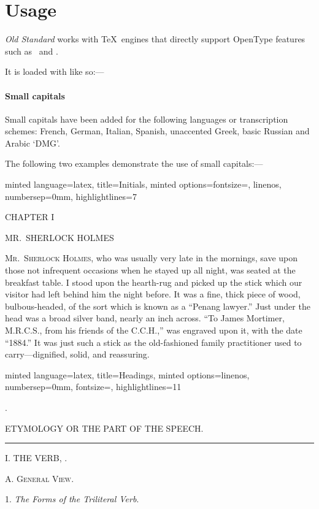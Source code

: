 \section{Usage}
\label{sec:usage}
\emph{Old Standard} works with \TeX\ engines that directly support
OpenType features such as \XeTeX\ and \LuaTeX.

It is loaded with  like so:---
\begin{code}
  \usepackage{fontspec}
  \setmainfont{Old Standard}
\end{code}

\paragraph{Small capitals}
Small capitals have been added for the following languages or
transcription schemes: French, German, Italian, Spanish, unaccented
Greek, basic Russian and Arabic \enquote*{DMG}.

The following two examples demonstrate the use of small capitals:---
\begin{tcblisting}{minted language=latex, title=Initials, minted
    options={fontsize=\smaller, linenos, numbersep=0mm,
      highlightlines={7}}}
  \begin{center}
    CHAPTER I

    MR.\ SHERLOCK HOLMES
  \end{center}
  
  \lettrine[loversize=0.2]{M}{r.\ Sherlock Holmes}, who was usually
  very late in the mornings, save upon those not infrequent occasions
  when he stayed up all night, was seated at the breakfast table. I
  stood upon the hearth-rug and picked up the stick which our visitor
  had left behind him the night before.  It was a fine, thick piece of
  wood, bulbous-headed, of the sort which is known as a
  \enquote{Penang lawyer.} Just under the head was a broad silver
  band, nearly an inch across. \enquote{To James Mortimer, M.R.C.S.,
    from his friends of the C.C.H.,} was engraved upon it, with the
  date \enquote{1884.} It was just such a stick as the old-fashioned
  family practitioner used to carry—dignified, solid, and reassuring.
\end{tcblisting}

\begin{tcblisting}{minted language=latex, title=Headings, minted
    options={linenos, numbersep=0mm, fontsize=\smaller,
      highlightlines={11}}}
  \doublespacing
  \begin{center}
    .

    ETYMOLOGY OR THE PART OF THE SPEECH.
    
    \rule{1in}{0.4pt}

    I. THE VERB, .

    A. \textsc{General View}.

    1. \emph{The Forms of the Triliteral Verb}.
  \end{center}
\end{tcblisting}

